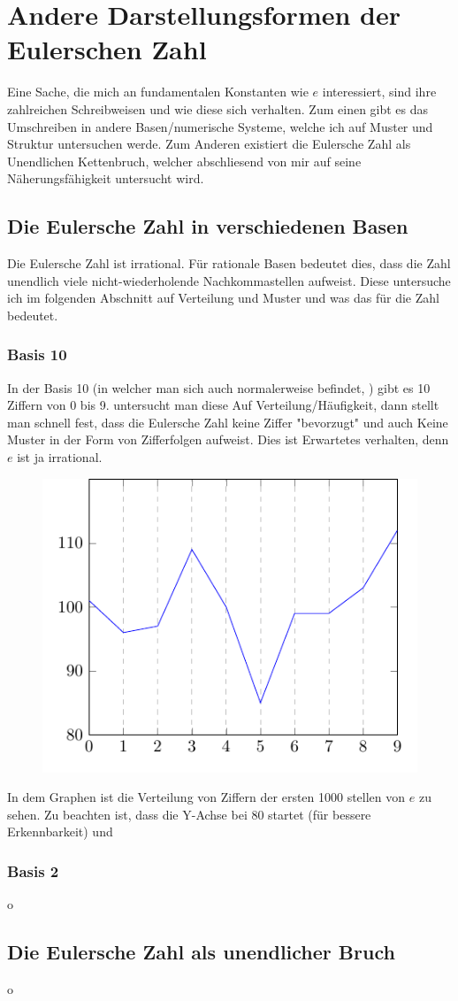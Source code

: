\section{Andere Darstellungsformen der Eulerschen Zahl}
Eine Sache, die mich an fundamentalen Konstanten wie $e$ interessiert, sind ihre zahlreichen Schreibweisen und wie diese sich verhalten. Zum einen gibt es das Umschreiben in andere Basen/numerische Systeme, welche ich auf Muster und Struktur untersuchen werde. Zum Anderen existiert die Eulersche Zahl als Unendlichen Kettenbruch, welcher abschliesend von mir auf seine Näherungsfähigkeit untersucht wird. \subsection{Die Eulersche Zahl in verschiedenen Basen}
Die Eulersche Zahl ist irrational. Für rationale Basen bedeutet dies, dass die Zahl unendlich viele nicht-wiederholende Nachkommastellen aufweist. Diese untersuche ich im folgenden Abschnitt auf Verteilung und Muster und was das für die Zahl bedeutet.
\subsubsection{Basis 10}
In der Basis 10 (in welcher man sich auch normalerweise befindet, ) gibt es 10 Ziffern von 0 bis 9. untersucht man diese Auf Verteilung/Häufigkeit, dann stellt man schnell fest, dass die Eulersche Zahl keine Ziffer "bevorzugt" und auch Keine Muster in der Form von Zifferfolgen aufweist. Dies ist Erwartetes verhalten, denn $e$ ist ja irrational.
\begin{figure}[h]
  \includegraphics{medien2/basis10/basis10.pdf}
  \centering
\end{figure}
\par In dem Graphen ist die Verteilung von Ziffern der ersten 1000 stellen von $e$ zu sehen. Zu beachten ist, dass die Y-Achse bei 80 startet (für bessere Erkennbarkeit) und 
\subsubsection{Basis 2}
o
\subsection{Die Eulersche Zahl als unendlicher Bruch}
o
